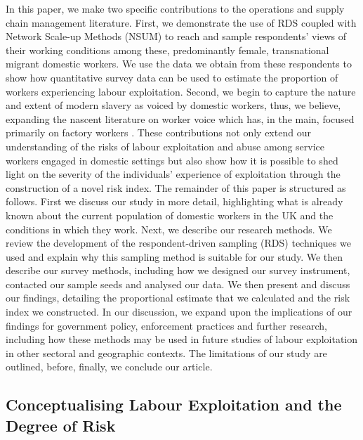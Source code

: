\documentclass[
  12pt,
  letterpaper,
  DIV=11,
  numbers=noendperiod]{scrartcl}
\theoremstyle{plain}
\theoremstyle{definition}
\begin{document}
In this paper, we make two specific contributions to the operations and
supply chain management literature. First, we demonstrate the use of RDS
coupled with Network Scale-up Methods (NSUM) to reach and sample
respondents' views of their working conditions among these,
predominantly female, transnational migrant domestic workers. We use the
data we obtain from these respondents to show how quantitative survey data can be
used to estimate the proportion of workers experiencing labour
exploitation. Second, we begin to capture the nature and extent of
modern slavery as voiced by domestic workers, thus, we
believe, expanding the nascent literature on worker voice which has, in
the main, focused primarily on factory workers
\autocite{stephens_theorising_2024}. These contributions
not only extend our understanding of the risks of labour exploitation
and abuse among service workers engaged in domestic settings but also
show how it is possible to shed light on the severity of the
individuals' experience of exploitation through the construction of a
novel risk index. The remainder of this paper is structured as follows.
First we discuss our study in more detail, highlighting what is already known about the
current population of domestic workers in the UK and the conditions in
which they work. Next, we describe our research methods. We review the
development of the respondent-driven sampling (RDS) techniques we used
and explain why this sampling method is suitable for our study. We then
describe our survey methods, including how we designed our survey
instrument, contacted our sample seeds and analysed our data. We then
present and discuss our findings, detailing the proportional estimate
that we calculated and the risk index we constructed. In our discussion,
we expand upon the implications of our findings for government policy,
enforcement practices and further research, including how these methods
may be used in future studies of labour exploitation in other sectoral
and geographic contexts. The limitations of our study are outlined,
before, finally, we conclude our article.

\subsection{Conceptualising Labour Exploitation and the Degree of
Risk}\label{conceptualising-labour-exploitation-and-the-degree-of-risk}
\end{document}
